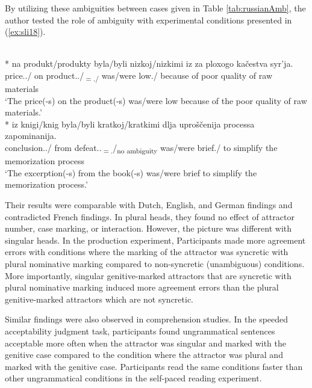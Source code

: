 By utilizing these ambiguities between cases given in Table \ref{tab:russianAmb}, the author tested the role of ambiguity with experimental conditions presented in (\ref{ex:sli18}).

\ea \label{ex:sli18}
  \\*
     na {produkt/produkty} byla/byli nizkoj/nizkimi {iz za ploxogo ka\v{c}estva syr'ja.}\\
    price.\Nom.\Sg/\Pl{} on product.\Acc.\Sg/\Pl\textsubscript{$=$\Nom.\Sg/\Pl} was/were low.\Sg/\Pl{} {because of poor quality of raw materials}\\
    \glt `The price(-s) on the product(-s) was/were low because of the poor quality of raw materials.'
  \\*
     iz knigi/knig byla/byli kratkoj/kratkimi {dlja upro\v{s}\v{c}enija processa zapominanija.}\\
    conclusion.\Nom.\Sg/\Pl{} from defeat.\Gen.\Sg\textsubscript{$=$\Nom.\Pl}/\Pl\textsubscript{no ambiguity} was/were brief.\Sg/\Pl{} {to simplify the memorization process}\\
    \glt `The excerption(-s) from the book(-s) was/were brief to simplify the memorization process.'
  \z
\z

Their results were comparable with Dutch, English, and German findings and contradicted French findings. In plural heads, they found no effect of attractor number, case marking, or interaction. However, the picture was different with singular heads. In the production experiment, Participants made more agreement errors with conditions where the marking of the attractor was syncretic with plural nominative marking compared to non-syncretic (unambiguous) conditions. More importantly, singular genitive-marked attractors that are syncretic with plural nominative marking induced more agreement errors than the plural genitive-marked attractors which are not syncretic. 

Similar findings were also observed in comprehension studies. In the speeded acceptability judgment task, participants found ungrammatical sentences acceptable more often when the attractor was singular and marked with the genitive case compared to the condition where the attractor was plural and marked with the genitive case. Participants read the same conditions faster than other ungrammatical conditions in the self-paced reading experiment. 


